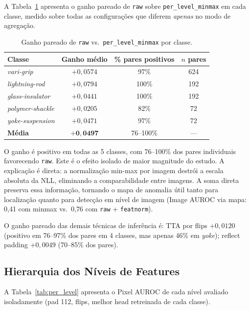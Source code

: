 \documentclass[conference]{IEEEtran}
\begin{document}
A Tabela~\ref{tab:raw_vs_minmax} apresenta o ganho pareado de \texttt{raw} sobre \texttt{per\_level\_minmax} em cada classe, medido sobre todas as configurações que diferem \textit{apenas} no modo de agregação.

\begin{table}[htb]
\centering
\caption{Ganho pareado de \texttt{raw} vs.\ \texttt{per\_level\_minmax} por classe.}
\label{tab:raw_vs_minmax}
\begin{tabular}{@{}lccc@{}}
\toprule
Classe & Ganho médio & \% pares positivos & $n$ pares \\
\midrule
\textit{vari-grip}       & $+0{,}0574$ & 97\%   & 624  \\
\textit{lightning-rod}    & $+0{,}0794$ & 100\%  & 192  \\
\textit{glass-insulator}  & $+0{,}0441$ & 100\%  & 192  \\
\textit{polymer-shackle}  & $+0{,}0205$ & 82\%   & 72   \\
\textit{yoke-suspension}  & $+0{,}0471$ & 97\%   & 72   \\
\midrule
\textbf{Média}            & $\mathbf{+0{,}0497}$ & 76--100\% & ---  \\
\bottomrule
\end{tabular}
\end{table}

O ganho é positivo em todas as 5 classes, com 76--100\% dos pares individuais favorecendo \texttt{raw}. Este é o efeito isolado de maior magnitude do estudo. A explicação é direta: a normalização min-max por imagem destrói a escala absoluta da NLL, eliminando a comparabilidade entre imagens. A soma direta preserva essa informação, tornando o mapa de anomalia útil tanto para localização quanto para detecção em nível de imagem (Image AUROC via mapa: 0{,}41 com minmax vs.\ 0{,}76 com \texttt{raw} + \texttt{featnorm}).

O ganho pareado das demais técnicas de inferência é: TTA por flips $+0{,}0120$ (positivo em 76--97\% dos pares em 4 classes, mas apenas 46\% em \textit{yoke}); reflect padding $+0{,}0049$ (70--85\% dos pares).

\subsection{Hierarquia dos Níveis de Features}
\label{sec:levels}

A Tabela~\ref{tab:per_level} apresenta o Pixel AUROC de cada nível avaliado isoladamente (pad 112, flips, melhor head retreinada de cada classe).
\end{document}
